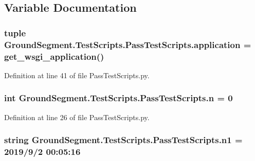 \subsection{Variable Documentation}
\hypertarget{namespace_ground_segment_1_1_test_scripts_1_1_pass_test_scripts_a72d0cbf8031b7273f70f08836227ed45}{}
\subsubsection[{application}]{\setlength{\rightskip}{0pt plus 5cm}tuple Ground\+Segment.\+Test\+Scripts.\+Pass\+Test\+Scripts.\+application = get\+\_\+wsgi\+\_\+application()}\label{namespace_ground_segment_1_1_test_scripts_1_1_pass_test_scripts_a72d0cbf8031b7273f70f08836227ed45}


Definition at line 41 of file Pass\+Test\+Scripts.\+py.

\hypertarget{namespace_ground_segment_1_1_test_scripts_1_1_pass_test_scripts_a66d2d17525c7711372faa806bf13971b}{}
\subsubsection[{n}]{\setlength{\rightskip}{0pt plus 5cm}int Ground\+Segment.\+Test\+Scripts.\+Pass\+Test\+Scripts.\+n = 0}\label{namespace_ground_segment_1_1_test_scripts_1_1_pass_test_scripts_a66d2d17525c7711372faa806bf13971b}


Definition at line 26 of file Pass\+Test\+Scripts.\+py.

\hypertarget{namespace_ground_segment_1_1_test_scripts_1_1_pass_test_scripts_a1abcda4c86be68937428435d615f2a84}{}
\subsubsection[{n1}]{\setlength{\rightskip}{0pt plus 5cm}string Ground\+Segment.\+Test\+Scripts.\+Pass\+Test\+Scripts.\+n1 = \textquotesingle{}2019/9/2 00\+:05\+:16\textquotesingle{}}\label{namespace_ground_segment_1_1_test_scripts_1_1_pass_test_scripts_a1abcda4c86be68937428435d615f2a84}


